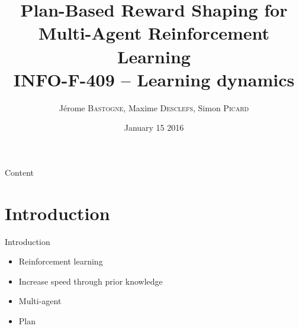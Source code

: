 \documentclass{bredelebeamer}
\begin{document}
\title[PBRS for MARL]{\textbf{Plan-Based Reward Shaping for Multi-Agent Reinforcement Learning} \\INFO-F-409 -- Learning dynamics} %

\author[]{Jérome \textsc{Bastogne}, Maxime \textsc{Desclefs}, Simon \textsc{Picard}}
\date{January 15 2016} %

\begin{frame}
\titlepage %
\end{frame}

\begin{frame}{Content}
\tableofcontents %
\end{frame}

\section{Introduction}
\begin{frame}{Introduction}

\begin{block}{}
\begin{itemize}
\item Reinforcement learning
\item Increase speed through prior knowledge
\item Multi-agent
\item Plan
\end{itemize}
\end{block}

\end{frame}
\end{document}
